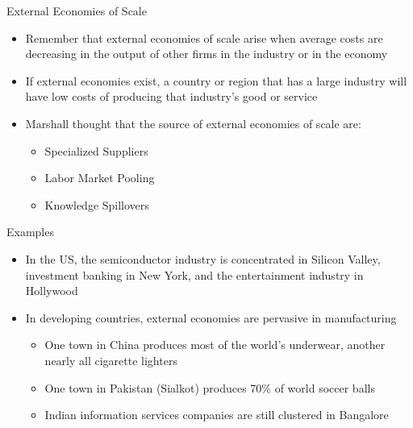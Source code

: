 \documentclass[10pt,hyperref={CJKbookmarks=true},xcolor=dvipsnames,aspectratio=169]{beamer}
\begin{document}
\begin{frame}{External Economies of Scale }

\begin{itemize}
\item Remember that external economies of scale arise when average costs
are decreasing in the output of other firms in the industry or in
the economy 
\item If external economies exist, a country or region that has a large
industry will have low costs of producing that industry’s good or
service 
\item Marshall thought that the source of external economies of scale are:

\begin{itemize}
\item Specialized Suppliers
\item Labor Market Pooling
\item Knowledge Spillovers
\end{itemize}
\end{itemize}
\end{frame}

\begin{frame}{Examples }

\begin{itemize}
\item In the US, the semiconductor industry is concentrated in Silicon Valley,
investment banking in New York, and the entertainment industry in
Hollywood 
\item In developing countries, external economies are pervasive in manufacturing 

\begin{itemize}
\item One town in China produces most of the world’s underwear, another
nearly all cigarette lighters 
\item One town in Pakistan (Sialkot) produces 70\% of world soccer balls 
\item Indian information services companies are still clustered in Bangalore 
\end{itemize}
\end{itemize}
\end{frame}
\end{document}
